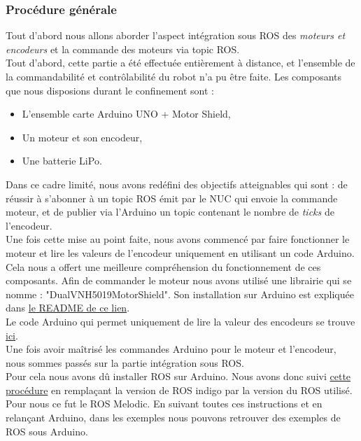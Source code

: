 \documentclass[french]{rapportENSTAB}
\begin{document}
\subsubsection{Procédure générale}
Tout d'abord nous allons aborder l'aspect intégration sous ROS des \textit{moteurs et encodeurs} et la commande des moteurs via topic ROS.\\

Tout d'abord, cette partie a été effectuée entièrement à distance, et l'ensemble de la commandabilité et contrôlabilité du robot n'a pu être faite. Les composants que nous disposions durant le confinement sont : \begin{itemize}[label=\textbullet, font=\small\color{blue}]
    \item L'ensemble carte Arduino UNO + Motor Shield,
    \item Un moteur et son encodeur,
    \item Une batterie LiPo.
\end{itemize}

Dans ce cadre limité, nous avons redéfini des objectifs atteignables qui sont : de réussir à s'abonner à un topic ROS émit par le NUC qui envoie la commande moteur, et de publier via l'Arduino un topic contenant le nombre de \textit{ticks} de l'encodeur.\\

Une fois cette mise au point faite, nous avons commencé par faire fonctionner le moteur et lire les valeurs de l'encodeur uniquement en utilisant un code Arduino. Cela nous a offert une meilleure compréhension du fonctionnement de ces composants. Afin de commander le moteur nous avons utilisé une librairie qui se nomme : "DualVNH5019MotorShield". Son installation sur Arduino est expliquée dans \href{https://github.com/AntoninLize/Projet_OrangeLabs/tree/master/Code/Arduino}{le README de ce lien}.\\

Le code Arduino qui permet uniquement de lire la valeur des encodeurs se trouve
\href{https://github.com/AntoninLize/Projet_OrangeLabs/tree/master/Code/Arduino/Encoder}{ici}.\\

Une fois avoir maîtrisé les commandes Arduino pour le moteur et l'encodeur, nous sommes passés sur la partie intégration sous ROS.\\

Pour cela nous avons dû installer ROS sur Arduino. Nous avons donc suivi \href{http://wiki.ros.org/rosserial_arduino/Tutorials/Arduino%20IDE%20Setup}{cette procédure} en remplaçant la version de ROS indigo par la version du ROS utilisé. Pour nous ce fut le ROS Melodic. En suivant toutes ces instructions et en relançant Arduino, dans les exemples nous pouvons retrouver des exemples de ROS sous Arduino.\\ 
\end{document}
